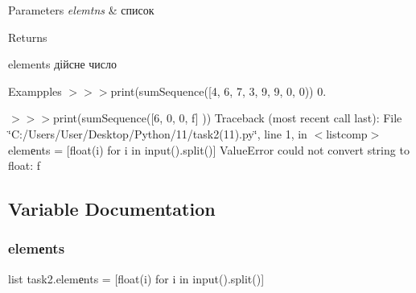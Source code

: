 \begin{DoxyParams}{Parameters}
{\em elemtns} & список\\
\hline
\end{DoxyParams}
\begin{DoxyReturn}{Returns}


elements дійсне число
\end{DoxyReturn}
\begin{DoxyParagraph}{Exampples}
$>$$>$$>$print(sum\+Sequence(\mbox{[}4, 6, 7, 3, 9, 9, 0, 0)) 0. 
\end{DoxyParagraph}
\begin{DoxyParagraph}{}
$>$$>$$>$print(sum\+Sequence(\mbox{[}6, 0, 0, f\mbox{]} )) Traceback (most recent call last)\+: File \char`\"{}\+C\+:/\+Users/\+User/\+Desktop/\+Python/11/task2(11).\+py\char`\"{}, line 1, in $<$listcomp$>$ elemеnts = \mbox{[}float(i) for i in input().split()\mbox{]} Value\+Error could not convert string to float\+: \textquotesingle{}f\textquotesingle{} 
\end{DoxyParagraph}


\subsection{Variable Documentation}
\mbox{\label{namespacetask2_a732f5a3629ece6b5f7c76c93c1676f01}} 
\subsubsection{\texorpdfstring{elemеnts}{elemеnts}}
{\footnotesize\ttfamily list task2.\+elemеnts = \mbox{[}float(i) for i in input().split()\mbox{]}}

